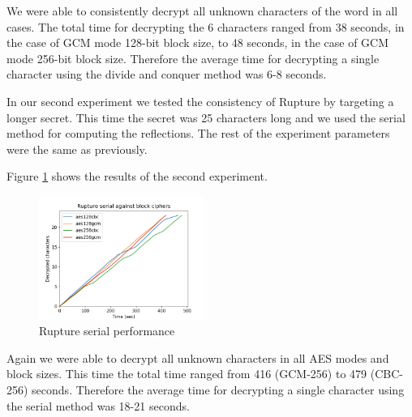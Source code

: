 We were able to consistently decrypt all unknown characters of the word in all
cases. The total time for decrypting the 6 characters ranged from 38 seconds, in
the case of GCM mode 128-bit block size, to 48 seconds, in the case of GCM mode
256-bit block size. Therefore the average time for decrypting a single character
using the divide and conquer method was 6-8 seconds.

In our second experiment we tested the consistency of Rupture by targeting a
longer secret. This time the secret was 25 characters long and we used the
serial method for computing the reflections. The rest of the experiment
parameters were the same as previously.

Figure \ref{fig:rupture_performance_serial} shows the results of the second
experiment.

   \begin{figure}[thpb]
      \centering
          \includegraphics[width=0.48\textwidth]{experiments/rupture_performance/rupture_serial_performance.png}
      \caption{Rupture serial performance}
      \label{fig:rupture_performance_serial}
   \end{figure}

Again we were able to decrypt all unknown characters in all AES modes and block
sizes. This time the total time ranged from 416 (GCM-256) to 479 (CBC-256)
seconds. Therefore the average time for decrypting a single character using the
serial method was 18-21 seconds.
